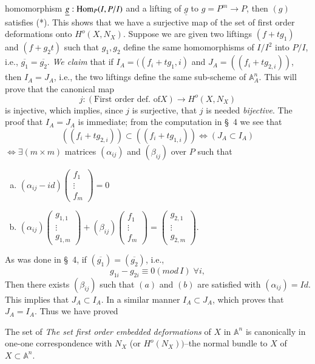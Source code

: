 { homomorphism $\underline{g}:\operatorname{Hom}_P(I,P/I)$ and a lifting of
 $\underline{g}$ to $g=P^{m}\to P$, then $(g)$ satisfies (*). This
 shows that we have a surjective map of the set of first order
 deformations onto $H^{o}(X, N_X)$. Suppose we are given two liftings
 $(f+tg_1)$ and $(f+g_2t)$ such that $g_1, g_2$ define the same
 homomorphisms of $I/I^{2}$ into $P/I$, i.e.,
 $\overline{g_{1}}=\overline{g_{2}}$. {\em We claim} that if
 $I_A=((f_i+tg_1,i)$ and $J_A=((f_i+tg_{2, i}))$, then $I_A=J_A$, i.e.,
 the two liftings define the same sub-scheme of
 $\mathbb{A}^{n}_A$. This will prove that the canonical map  
$$ 
j:(\text{First order def. of} X)\to H^{o}(X, N_X)
$$\pageoriginale
is injective, which implies, since $j$ is surjective, that $j$ is
needed {\em bijective}. The proof that $I_A=J_A$ is immediate; from
the computation in \S\ 4 we see that  
$$
((f_i+tg_{2,i}))\subset((f_i+tg_{1,i}))\Leftrightarrow(J_A\subset I_A)
$$
$\Leftrightarrow \exists (m \times m)$ matrices $(\alpha_{ij})$ and
$(\beta_{ij})$ over $P$ such that 
\begin{enumerate}[(a)]
\item $(\alpha_{ij}-id)\begin{pmatrix}
f_1\\
\vdots\\
f_m
\end{pmatrix}=0$
\item $(\alpha_{ij})\begin{pmatrix}
g_{1,1}\\
\vdots\\
g_{1,m}
\end{pmatrix}+(\beta_{ij})\begin{pmatrix}
f_1\\
\vdots\\
f_m
\end{pmatrix}=\begin{pmatrix}
g_{2,1}\\
\vdots\\
g_{2,m}
\end{pmatrix}$.
\end{enumerate}

As was done in \S\ 4, if $(\overline{g_1})=(\overline{g_2})$, i.e.,
$$
g_{1i}-g_{2i}\equiv 0 (mod\, I) \; \forall i,
$$
Then there exists $(\beta_{ij})$ such that $(a)$ and $(b)$ are
satisfied with $(\alpha_{ij})=Id$. This implies that $J_A\subset
I_A$. In a similar manner $I_A\subset J_A$, which proves that
$J_A=I_A$. Thus we have proved 

\begin{theorem}\label{part1-thm6.1}%
The set of {\em The set first order embedded deformations} of $X$ in
$\mathbb{A}^{n}$ is canonically in one-one correspondence with $N_X$
(or $H^{o}(N_X))$--the normal bundle to $X$ of
$X\subset \mathbb{A}^{n}$. 
\end{theorem}

}
